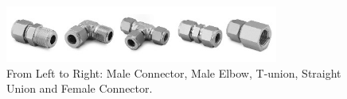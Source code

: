 \documentclass[a4paper,12pt,oneside]{article} %
\providecommand{\DIFdelbeginFL}{} %
\newcommand{\DIFscaledelfig}{0.5}
\newlength{\DIFdelgraphicswidth} %
\newlength{\DIFdelgraphicsheight} %
\newcommand{\DIFdelincludegraphics}[2][]{%
\sbox{\DIFdelgraphicsbox}{\DIFOincludegraphics[#1]{#2}}%
\settoboxwidth{\DIFdelgraphicswidth}{\DIFdelgraphicsbox} %
\settoboxtotalheight{\DIFdelgraphicsheight}{\DIFdelgraphicsbox} %
\scalebox{\DIFscaledelfig}{%
\parbox[b]{\DIFdelgraphicswidth}{\usebox{\DIFdelgraphicsbox}\\[-\baselineskip] \rule{\DIFdelgraphicswidth}{0em}}\llap{\resizebox{\DIFdelgraphicswidth}{\DIFdelgraphicsheight}{%
\setlength{\unitlength}{\DIFdelgraphicswidth}%
\begin{picture}(1,1)%
\thicklines\linethickness{2pt} %
{\color[rgb]{1,0,0}\put(0,0){\framebox(1,1){}}}%
{\color[rgb]{1,0,0}\put(0,0){\line( 1,1){1}}}%
{\color[rgb]{1,0,0}\put(0,1){\line(1,-1){1}}}%
\end{picture}%
}\hspace*{3pt}}} %
} %
\DeclareRobustCommand{\DIFdelbeginFL}{\DIFOdelbeginFL \let\includegraphics\DIFdelincludegraphics} %
\begin{document}
\begin{figure}[H]
    \centering
    \includegraphics[width=0.8\textwidth]{4-experiment-design/img/Mechanical/AAC-interfaces.jpg}
    \caption{From Left to Right: Male Connector, Male Elbow, T-union, Straight Union and Female Connector.}
    \label{fig:AAC-interfaces-fittings}
\end{figure}

\begin{table}[H]
\centering
\DIFdelbeginFL %

\end{table}
\end{document}
